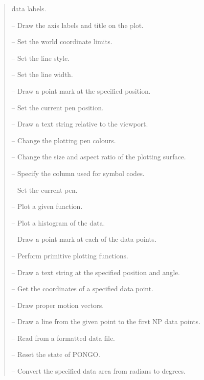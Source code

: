 \begin {quote}
\begin {description}
                                          data labels.
\item [\iiref{LAB(EL)}{LABEL}] -- Draw the axis labels and title on
                                  the plot.
\item [\iiref{LIM(ITS)}{LIMITS}] -- Set the world coordinate limits.
\item [\iiref{LT(YPE)}{LTYPE}] -- Set the line style.
\item [\iiref{LWE(IGHT)}{LWEIGHT}] -- Set the line width.
\item [\iref{MARK}] -- Draw a point mark at the specified position.
\item [\iref{MOVE}] -- Set the current pen position.
\item [\iref{MTEXT}] -- Draw a text string relative to the viewport.
\item [\iiref{PALET(TE)}{PALETTE}] -- Change the plotting pen colours.
\item [\iref{PAPER}] -- Change the size and aspect ratio of the plotting
                        surface.
\item [\iiref{PCOL(UMN)}{PCOLUMN}] -- Specify the column used for symbol
                                      codes.
\item [\iref{PEN}] -- Set the current pen.
\item [\iiref{PLOTF(UN)}{PLOTFUN}] -- Plot a given function.
\item [\iiref{PLOTH(IST)}{PLOTHIST}] -- Plot a histogram of the data.
\item [\iiref{POI(NTS)}{POINTS}] -- Draw a point mark at each of the
                                    data points.
\item [\iref{PRIM}] -- Perform primitive plotting functions.
\item [\iref{PTEXT}] -- Draw a text string at the specified position and angle.
\item [\iref{PTINFO}] -- Get the coordinates of a specified data point.
\item [\iref{PVECT}] -- Draw proper motion vectors.
\item [\iref{RADIATE}] -- Draw a line from the given point to the first NP data
                          points.
\item [\iiref{READ(F)}{READF}] -- Read from a formatted data file.
\item [\iiref{RESETP(ONGO)}{RESETPONGO}] -- Reset the state of PONGO.
\item [\iref{RTODEG}] -- Convert the specified data area from radians to
                         degrees.

\end{description}
\end{quote}
